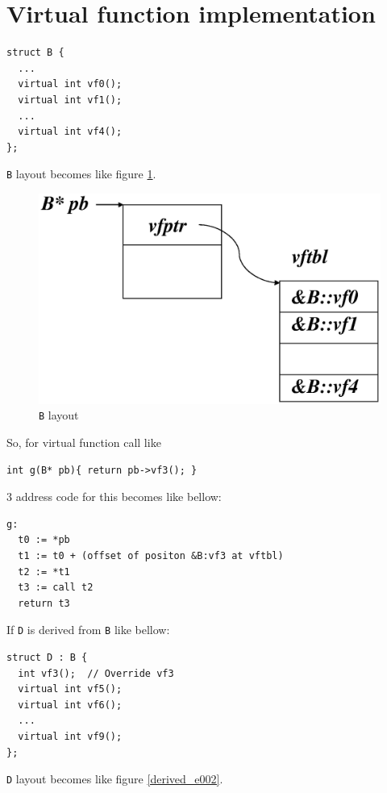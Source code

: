 \documentclass{article}
\begin{document}
\section{Virtual function implementation}

\begin{verbatim}
struct B {
  ...
  virtual int vf0();
  virtual int vf1();
  ...
  virtual int vf4();
};
\end{verbatim}
{\tt {B}} layout becomes like figure \ref{derived_e000}.

\vspace{0.5cm}
\begin{figure}[htbp]
\begin{center}
\includegraphics[width=1.0\linewidth,height=0.6\linewidth]{virtual_function.eps}
\caption{{\tt{B}} layout}
\label{derived_e000}
\end{center}
\end{figure}

So, for virtual function call like
\begin{verbatim}
int g(B* pb){ return pb->vf3(); }
\end{verbatim}
3 address code for this becomes like bellow:
\begin{verbatim}
g:
  t0 := *pb
  t1 := t0 + (offset of positon &B:vf3 at vftbl)
  t2 := *t1
  t3 := call t2
  return t3
\end{verbatim}

If {\tt{D}} is derived from {\tt{B}} like bellow:
\begin{verbatim}
struct D : B {
  int vf3();  // Override vf3
  virtual int vf5();
  virtual int vf6();
  ...
  virtual int vf9();
};
\end{verbatim}
{\tt {D}} layout becomes like figure \ref{derived_e002}.
\end{document}
